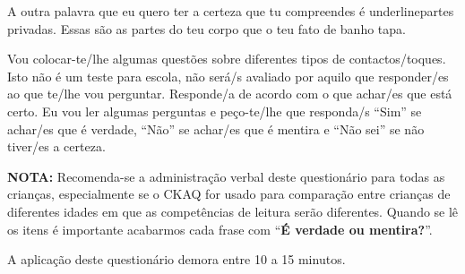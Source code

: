 A outra palavra que eu quero ter a certeza que tu compreendes é underline{partes privadas}. Essas são as partes do teu corpo que o teu fato de banho tapa.

Vou colocar-te/lhe algumas questões sobre diferentes tipos de contactos/toques. Isto não é um teste para escola, não será/s avaliado por aquilo que responder/es ao que te/lhe vou perguntar. Responde/a de acordo com o que achar/es que está certo. Eu vou ler algumas perguntas e peço-te/lhe que responda/s “Sim” se achar/es que é verdade, “Não” se achar/es que é mentira e “Não sei” se não tiver/es a certeza.

\vspace{1.0cm}

\noindent
\textbf{NOTA:} Recomenda-se a administração verbal deste questionário para todas as crianças, especialmente se o CKAQ for usado para comparação entre crianças de diferentes idades em que as competências de leitura serão diferentes. Quando se lê os itens é importante acabarmos cada frase com ``\textbf{É verdade ou mentira?}''.

\vspace{1.0cm}

A aplicação deste questionário demora entre 10 a 15 minutos.


